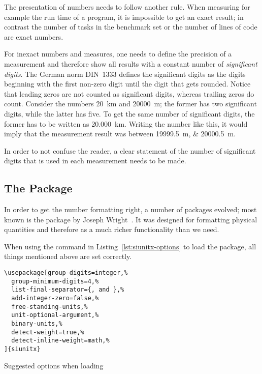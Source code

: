 The presentation of numbers needs to follow another rule.  When measuring for
example the run time of a program, it is impossible to get an exact result; in
contrast the number of tasks in the benchmark set or the number of lines of code
are exact numbers.

For inexact numbers and measures, one needs to define the precision of a
measurement and therefore show all results with a constant number of
\emph{significant digits}.  The German norm DIN~1333 defines the significant
digits as the digits beginning with the first non-zero digit until the digit
that gets rounded.  Notice that leading zeros are not counted as significant
digits, whereas trailing zeros do count.  Consider the numbers
\SI{20}{\kilo\meter} and \SI{20000}{\meter}; the former has two significant
digits, while the latter has five.  To get the same number of significant
digits, the former has to be written as \SI{20.000}{\kilo\meter}.  Writing the
number like this, it would imply that the measurement result was between
\SIlist{19999.5;20000.5}{\meter}.

In order to not confuse the reader, a clear statement of the number of
significant digits that is used in each measurement needs to be made.

\subsection{The Package }

In order to get the number formatting right, a number of packages evolved; most
known is the  package by Joseph Wright~\cite{Wright2016}.  It
was designed for formatting physical quantities and therefore as a much richer
functionality than we need.

When using the command in Listing~\ref{lst:siunitx-options} to load the package,
all things mentioned above are set correctly.

\begin{listing}[H]
\begin{verbatim}
\usepackage[group-digits=integer,%
  group-minimum-digits=4,%
  list-final-separator={, and },%
  add-integer-zero=false,%
  free-standing-units,%
  unit-optional-argument,%
  binary-units,%
  detect-weight=true,%
  detect-inline-weight=math,%
]{siunitx}
\end{verbatim}
\caption{Suggested options when loading }
\label{lst:siunitx-options}
\end{listing}

